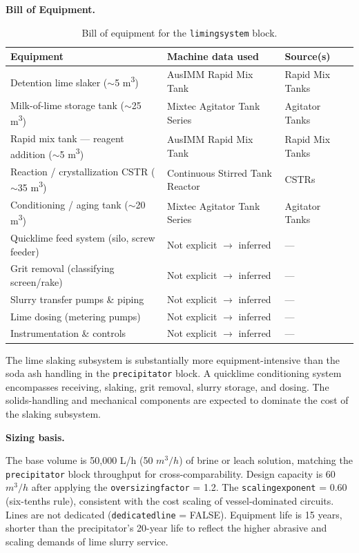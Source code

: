 \documentclass{article}
\renewcommand\_{\textunderscore\allowbreak}
\begin{document}
\medskip
\noindent\textbf{Bill of Equipment.}\quad
\begin{table}[h!]
\caption{Bill of equipment for the \texttt{liming\_system} block.}
\centering
\begin{tabular}{>{\raggedright\arraybackslash}p{5.2cm}
				>{\raggedright\arraybackslash}p{4cm}
				>{\raggedright\arraybackslash}p{4.5cm}}
\toprule
\textbf{Equipment} & \textbf{Machine data used} & \textbf{Source(s)} \\
\midrule
Detention lime slaker ($\sim$5 \si{m^3}) & AusIMM Rapid Mix Tank & Rapid Mix Tanks \\
Milk-of-lime storage tank ($\sim$25 \si{m^3}) & Mixtec Agitator Tank Series & Agitator Tanks \\
Rapid mix tank --- reagent addition ($\sim$5 \si{m^3}) & AusIMM Rapid Mix Tank & Rapid Mix Tanks \\
Reaction / crystallization CSTR ($\sim$35 \si{m^3}) & Continuous Stirred Tank Reactor & CSTRs \\
Conditioning / aging tank ($\sim$20 \si{m^3}) & Mixtec Agitator Tank Series & Agitator Tanks \\
Quicklime feed system (silo, screw feeder) & Not explicit $\rightarrow$ inferred & --- \\
Grit removal (classifying screen/rake) & Not explicit $\rightarrow$ inferred & --- \\
Slurry transfer pumps \& piping & Not explicit $\rightarrow$ inferred & --- \\
Lime dosing (metering pumps) & Not explicit $\rightarrow$ inferred & --- \\
Instrumentation \& controls & Not explicit $\rightarrow$ inferred & --- \\
\bottomrule
\end{tabular}
\end{table}

The lime slaking subsystem is substantially more equipment-intensive than the soda ash handling in the \texttt{precipitator} block. A quicklime conditioning system encompasses receiving, slaking, grit removal, slurry storage, and dosing. The solids-handling and mechanical components are expected to dominate the cost of the slaking subsystem.

\medskip
\noindent\textbf{Sizing basis.}\quad

The base volume is 50,000 L/h (50 $\si{m^3/h}$) of brine or leach solution, matching the \texttt{precipitator} block throughput for cross-comparability. Design capacity is 60 $\si{m^3/h}$ after applying the \texttt{oversizing\_factor} = 1.2. The \texttt{scaling\_exponent} = 0.60 (six-tenths rule), consistent with the cost scaling of vessel-dominated circuits. Lines are not dedicated (\texttt{dedicated\_line} = FALSE). Equipment life is 15 years, shorter than the precipitator's 20-year life to reflect the higher abrasive and scaling demands of lime slurry service.
\end{document}
